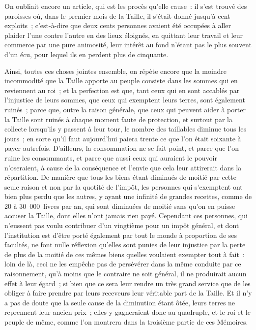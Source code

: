 \documentclass[french,twoside]{book} %
\begin{document}
On oubliait encore un article, qui est les procès qu’elle cause : il s’est trouvé des paroisses où, dans le premier mois de la Taille, il s’était donné jusqu’à cent exploits ; c’est-à-dire que deux cents personnes avaient été occupées à aller plaider l’une contre l’autre en des lieux éloignés, en quittant leur travail et leur commerce par une pure animosité, leur intérêt au fond n’étant pas le plus souvent d’un écu, pour lequel ils en perdent plus de cinquante.\par
Ainsi, toutes ces choses jointes ensemble, on répète encore que la moindre incommodité que la Taille apporte au peuple consiste dans les sommes qui en reviennent au roi ; et la perfection est que, tant ceux qui en sont accablés par l’injustice de leurs sommes, que ceux qui exemptent leurs terres, sont également ruinés ; parce que, outre la raison générale, que ceux qui peuvent aider à porter la Taille sont ruinés à chaque moment faute de protection, et surtout par la collecte lorsqu’ils y passent à leur tour, le nombre des taillables diminue tous les jours ; en sorte qu’il faut aujourd’hui paiera trente ce que l’on était soixante à payer autrefois. D’ailleurs, la consommation ne se fait point, et parce que l’on ruine les consommants, et parce que aussi ceux qui auraient le pouvoir n’oseraient, à cause de la conséquence et l’envie que cela leur attirerait dans la répartition. De manière que tous les biens étant diminués de moitié par cette seule raison et non par la quotité de l’impôt, les personnes qui s’exemptent ont bien plus perdu que les autres, y ayant une infinité de grandes recettes, comme de 20 à 30 000 livres par an, qui sont diminuées de moitié sans qu’on en puisse accuser la Taille, dont elles n’ont jamais rien payé. Cependant ces personnes, qui n’eussent pas voulu contribuer d’un vingtième pour un impôt général, et dont l’institution est d’être porté également par tout le monde à proportion de ses facultés, ne font nulle réflexion qu’elles sont punies de leur injustice par la perte de plus de la moitié de ces mêmes biens quelles voulaient exempter tout à fait : loin de là, ceci ne les empêche pas de persévérer dans la même conduite par ce raisonnement, qu’à moins que le contraire ne soit général, il ne produirait aucun effet à leur égard ; si bien que ce sera leur rendre un très grand service que de les obliger à faire prendre par leurs receveurs leur véritable part de la Taille. Et il n’y a pas de doute que la seule cause de la diminution étant ôtée, leurs terres ne reprennent leur ancien prix ; elles y gagneraient donc au quadruple, et le roi et le peuple de même, comme l’on montrera dans la troisième partie de ces Mémoires.
\end{document}
